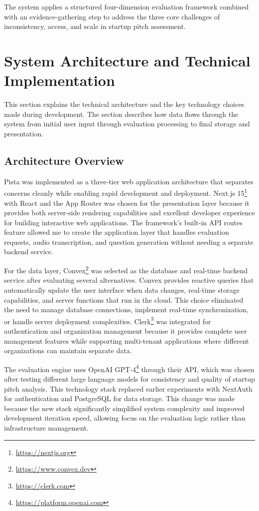 The system applies a structured four-dimension evaluation framework combined with an evidence-gathering step to address the three core challenges of inconsistency, access, and scale in startup pitch assessment.

\section{System Architecture and Technical Implementation} \label{sec:system-design}

This section explains the technical architecture and the key technology choices made during development. The section describes how data flows through the system from initial user input through evaluation processing to final storage and presentation.

\subsection{Architecture Overview}\label{subsec:architecture-overview}
Pista was implemented as a three-tier web application architecture that separates concerns cleanly while enabling rapid development and deployment. Next.js 15\footnote{\url{https://nextjs.org}} with React and the App Router was chosen for the presentation layer because it provides both server-side rendering capabilities and excellent developer experience for building interactive web applications. The framework's built-in API routes feature allowed me to create the application layer that handles evaluation requests, audio transcription, and question generation without needing a separate backend service.

For the data layer, Convex\footnote{\url{https://www.convex.dev}} was selected as the database and real-time backend service after evaluating several alternatives. Convex provides reactive queries that automatically update the user interface when data changes, real-time storage capabilities, and server functions that run in the cloud. This choice eliminated the need to manage database connections, implement real-time synchronization, or handle server deployment complexities. Clerk\footnote{\url{https://clerk.com}} was integrated for authentication and organization management because it provides complete user management features while supporting multi-tenant applications where different organizations can maintain separate data.

The evaluation engine uses OpenAI GPT-4\footnote{\url{https://platform.openai.com}} through their API, which was chosen after testing different large language models for consistency and quality of startup pitch analysis. This technology stack replaced earlier experiments with NextAuth for authentication and PostgreSQL for data storage. This change was made because the new stack significantly simplified system complexity and improved development iteration speed, allowing focus on the evaluation logic rather than infrastructure management.

